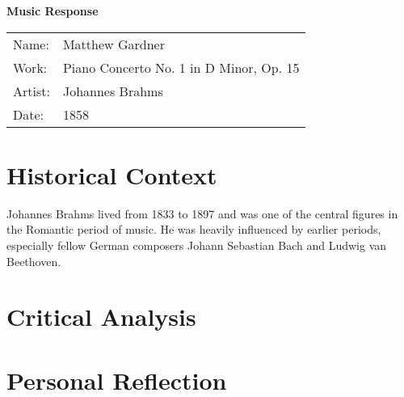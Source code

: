 \documentclass[onecolumn, 12pt]{article}
\title{}
\author{Matthew Gardner}
\date{}
\begin{document}
\textbf{Music Response}

\begin{tabular}{ll}
  Name:&Matthew Gardner \\
  Work:&Piano Concerto No. 1 in D Minor, Op. 15 \\
  Artist:&Johannes Brahms \\
  Date:&1858 \\
\end{tabular}

\section*{Historical Context}

Johannes Brahms lived from 1833 to 1897 and was one of the central figures in
the Romantic period of music.  He was heavily influenced by earlier periods,
especially fellow German composers Johann Sebastian Bach and Ludwig van
Beethoven.

\section*{Critical Analysis}

\section*{Personal Reflection}
\end{document}
